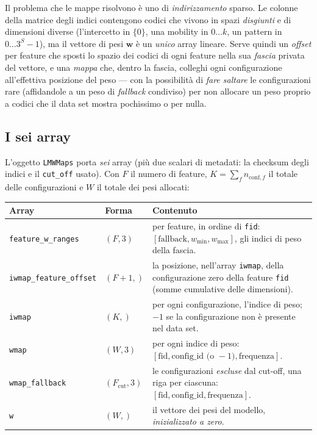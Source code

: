 Il problema che le mappe risolvono è uno di \emph{indirizzamento} sparso.
Le colonne della matrice degli indici contengono codici che vivono in spazi
\emph{disgiunti} e di dimensioni diverse (l'intercetto in $\{0\}$, una mobility
in $0\ldots k$, un pattern in $0\ldots 3^{S}-1$), ma il vettore di pesi
$\bm{w}$ è un \emph{unico} array lineare. Serve quindi un \emph{offset} per
feature che sposti lo spazio dei codici di ogni feature nella sua \emph{fascia}
privata del vettore, e una \emph{mappa} che, dentro la fascia, colleghi ogni
configurazione all'effettiva posizione del peso — con la possibilità di
\emph{fare saltare} le configurazioni rare (affidandole a un peso di
\emph{fallback} condiviso) per non allocare un peso proprio a codici che il
data set mostra pochissimo o per nulla.

\subsection{I sei array}

L'oggetto \texttt{LMWMaps} porta \emph{sei} array (più due scalari di
metadati: la checksum degli indici e il \texttt{cut\_off} usato). Con
$F$ il numero di feature, $K = \sum_f n_{\text{conf},f}$ il totale delle
configurazioni e $W$ il totale dei pesi allocati:

\begin{center}
\small
\begin{tabularx}{\textwidth}{@{}llX@{}}
\toprule
Array & Forma & Contenuto \\
\midrule
\texttt{feature\_w\_ranges} & $(F, 3)$ & per feature, in ordine di \texttt{fid}: $[\text{fallback}, w_{\min}, w_{\max}]$, gli indici di peso della fascia. \\
\texttt{iwmap\_feature\_offset} & $(F+1,)$ & la posizione, nell'array \texttt{iwmap}, della configurazione zero della feature \texttt{fid} (somme cumulative delle dimensioni). \\
\texttt{iwmap} & $(K,)$ & per ogni configurazione, l'indice di peso; $-1$ se la configurazione non è presente nel data set. \\
\texttt{wmap} & $(W, 3)$ & per ogni indice di peso: $[\text{fid}, \text{config\_id} \text{ (o } -1 \text{)}, \text{frequenza}]$. \\
\texttt{wmap\_fallback} & $(F_{\text{cut}}, 3)$ & le configurazioni \emph{escluse} dal cut-off, una riga per ciascuna: $[\text{fid}, \text{config\_id}, \text{frequenza}]$. \\
\texttt{w} & $(W,)$ & il vettore dei pesi del modello, \emph{inizializzato a zero}. \\
\bottomrule
\end{tabularx}
\end{center}

